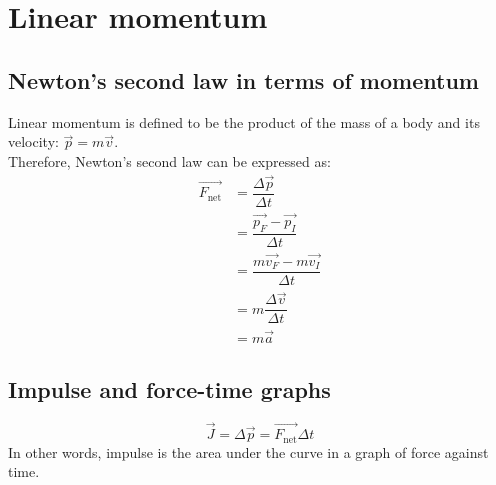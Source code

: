 \section{Linear momentum}
\subsection{Newton's second law in terms of momentum}
Linear momentum is defined to be the product of the mass of a body and its velocity: \(\vec{p}=m\vec{v}\).\\
Therefore, Newton's second law can be expressed as:
$$\begin{aligned}\vec{F_\text{net}}&=\dfrac{\Delta \vec{p}}{\Delta t}\\&=\dfrac{\vec{p_F}-\vec{p_I}}{\Delta t}\\&=\dfrac{m\vec{v_F}-m\vec{v_I}}{\Delta t}\\&=m\dfrac{\Delta \vec{v}}{\Delta t}\\&=m\vec{a}\end{aligned}$$
\subsection{Impulse and force-time graphs}
\[\vec{J}=\Delta \vec{p}=\vec{F_\text{net}}\Delta t\]
In other words, impulse is the area under the curve in a graph of force against time.
